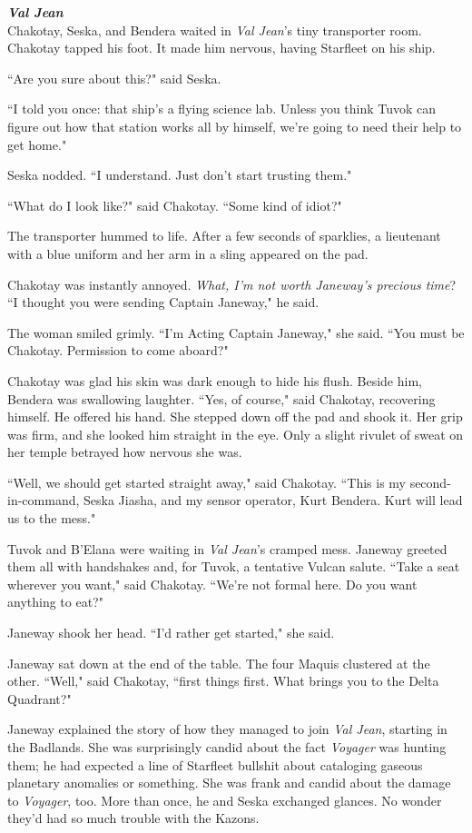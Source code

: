 \documentclass[twoside,letterpaper,12pt]{memoir}
\begin{document}
\noindent\textit{\textbf{Val Jean}}\\

Chakotay, Seska, and Bendera waited in \textit{Val Jean}'s tiny transporter room. Chakotay tapped his foot. It made him nervous, having Starfleet on his ship.

``Are you sure about this?" said Seska.

``I told you once: that ship's a flying science lab. Unless you think Tuvok can figure out how that station works all by himself, we're going to need their help to get home."

Seska nodded. ``I understand. Just don't start trusting them."

``What do I look like?" said Chakotay. ``Some kind of idiot?"

The transporter hummed to life. After a few seconds of sparklies, a lieutenant with a blue uniform and her arm in a sling appeared on the pad.

Chakotay was instantly annoyed. \textit{What, I'm not worth Janeway's precious time}? ``I thought you were sending Captain Janeway," he said.

The woman smiled grimly. ``I'm Acting Captain Janeway," she said. ``You must be Chakotay. Permission to come aboard?"

Chakotay was glad his skin was dark enough to hide his flush. Beside him, Bendera was swallowing laughter. ``Yes, of course," said Chakotay, recovering himself. He offered his hand. She stepped down off the pad and shook it. Her grip was firm, and she looked him straight in the eye. Only a slight rivulet of sweat on her temple betrayed how nervous she was.

``Well, we should get started straight away," said Chakotay. ``This is my second-in-command, Seska Jiasha, and my sensor operator, Kurt Bendera. Kurt will lead us to the mess."

Tuvok and B'Elana were waiting in \textit{Val Jean}'s cramped mess. Janeway greeted them all with handshakes and, for Tuvok, a tentative Vulcan salute. ``Take a seat wherever you want," said Chakotay. ``We're not formal here. Do you want anything to eat?"

Janeway shook her head. ``I'd rather get started," she said.

Janeway sat down at the end of the table. The four Maquis clustered at the other. ``Well," said Chakotay, ``first things first. What brings you to the Delta Quadrant?"

Janeway explained the story of how they managed to join \textit{Val Jean}, starting in the Badlands. She was surprisingly candid about the fact \textit{Voyager} was hunting them; he had expected a line of Starfleet bullshit about cataloging gaseous planetary anomalies or something. She was frank and candid about the damage to \textit{Voyager}, too. More than once, he and Seska exchanged glances. No wonder they'd had so much trouble with the Kazons.
\end{document}
